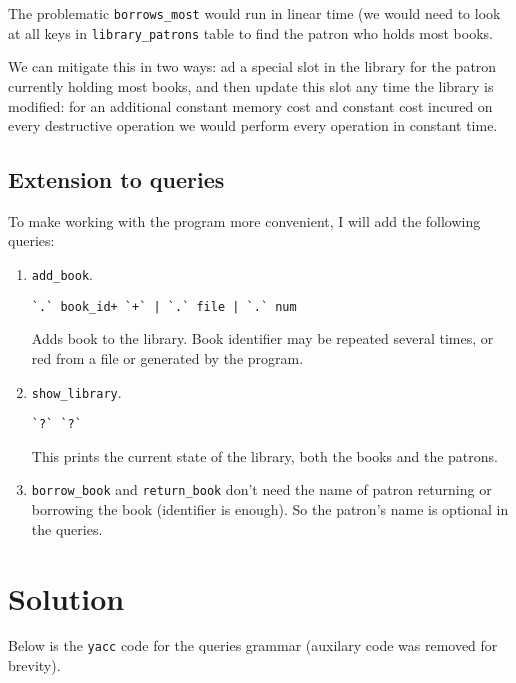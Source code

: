 \documentclass[11pt]{article}
\begin{document}
The problematic \texttt{borrows\_most} would run in linear time (we would need to
look at all keys in \texttt{library\_patrons} table to find the patron who holds most
books.

We can mitigate this in two ways: ad a special slot in the library for the
patron currently holding most books, and then update this slot any time the
library is modified: for an additional constant memory cost and constant cost
incured on every destructive operation we would perform every operation in
constant time.

\subsection{Extension to queries}
\label{sec-2-3}
To make working with the program more convenient, I will add the following
queries:
\begin{enumerate}
\item \texttt{add\_book}.
\begin{verbatim}
`.` book_id+ `+` | `.` file | `.` num
\end{verbatim}
Adds book to the library.  Book identifier may be repeated several times,
or red from a file or generated by the program.
\item \texttt{show\_library}.
\begin{verbatim}
`?` `?`
\end{verbatim}
This prints the current state of the library, both the books and the
patrons.
\item \texttt{borrow\_book} and \texttt{return\_book} don't need the name of patron returning or
borrowing the book (identifier is enough).  So the patron's name is
optional in the queries.
\end{enumerate}

\section{Solution}
\label{sec-3}
Below is the \texttt{yacc} code for the queries grammar (auxilary code was removed
for brevity).
\end{document}
